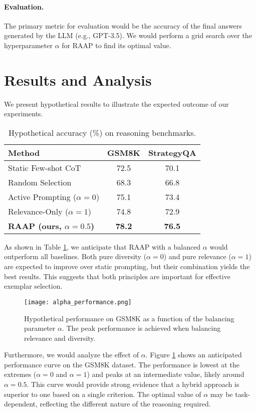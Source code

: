 \documentclass[10pt,twocolumn,letterpaper]{article}
\begin{document}
\paragraph{Evaluation.}
The primary metric for evaluation would be the accuracy of the final answers generated by the LLM (e.g., GPT-3.5). We would perform a grid search over the hyperparameter $\alpha$ for RAAP to find its optimal value.

\section{Results and Analysis}

We present hypothetical results to illustrate the expected outcome of our experiments.

\begin{table}[h]
\centering
\caption{Hypothetical accuracy (\%) on reasoning benchmarks.}
\label{tab:results}
\begin{tabular}{lcc}
\hline
\textbf{Method} & \textbf{GSM8K} & \textbf{StrategyQA} \\
\hline
Static Few-shot CoT & 72.5 & 70.1 \\
Random Selection & 68.3 & 66.8 \\
\hline
Active Prompting ($\alpha=0$) & 75.1 & 73.4 \\
Relevance-Only ($\alpha=1$) & 74.8 & 72.9 \\
\textbf{RAAP (ours, $\alpha=0.5$)} & \textbf{78.2} & \textbf{76.5} \\
\hline
\end{tabular}
\end{table}

As shown in Table \ref{tab:results}, we anticipate that RAAP with a balanced $\alpha$ would outperform all baselines. Both pure diversity ($\alpha=0$) and pure relevance ($\alpha=1$) are expected to improve over static prompting, but their combination yields the best results. This suggests that both principles are important for effective exemplar selection.

\begin{figure}[h]
  \centering
  \texttt{[image: alpha\_performance.png]}
  \caption{Hypothetical performance on GSM8K as a function of the balancing parameter $\alpha$. The peak performance is achieved when balancing relevance and diversity.}
  \label{fig:alpha}
\end{figure}

Furthermore, we would analyze the effect of $\alpha$. Figure \ref{fig:alpha} shows an anticipated performance curve on the GSM8K dataset. The performance is lowest at the extremes ($\alpha=0$ and $\alpha=1$) and peaks at an intermediate value, likely around $\alpha=0.5$. This curve would provide strong evidence that a hybrid approach is superior to one based on a single criterion. The optimal value of $\alpha$ may be task-dependent, reflecting the different nature of the reasoning required.
\end{document}
